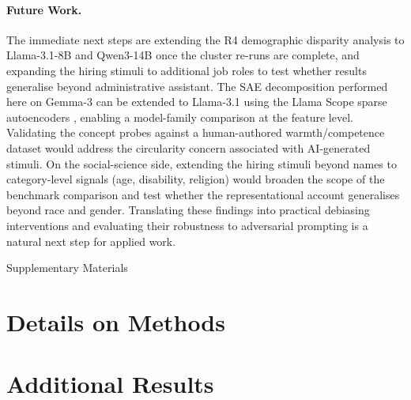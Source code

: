 \documentclass[twocolumn]{article}
\begin{document}
\paragraph{Future Work.}
The immediate next steps are extending the R4 demographic disparity
analysis to Llama-3.1-8B and Qwen3-14B once the cluster re-runs are
complete, and expanding the hiring stimuli to additional job roles to
test whether results generalise beyond administrative assistant.
The SAE decomposition performed here on Gemma-3 can be extended to
Llama-3.1 using the Llama Scope sparse autoencoders \citep{lindsey2025llama},
enabling a model-family comparison at the feature level.
Validating the concept probes against a human-authored warmth/competence
dataset would address the circularity concern associated with
AI-generated stimuli.
On the social-science side, extending the hiring stimuli beyond names to
category-level signals (age, disability, religion) would broaden the
scope of the benchmark comparison and test whether the representational
account generalises beyond race and gender.
Translating these findings into practical debiasing interventions and
evaluating their robustness to adversarial prompting is a natural next
step for applied work.

{
\small

\clearpage
\printbibliography
}



\clearpage
\onecolumn
\setcounter{figure}{0}
\setcounter{table}{0}
\renewcommand\appendix{\par
  \setcounter{section}{0}%
  \renewcommand{\thesection}{\Alph{section}}}
\renewcommand\thefigure{S.\arabic{figure}}
\renewcommand\thetable{S.\arabic{table}}
\begin{center}
    \begin{minipage}{\textwidth}
        \centering
        \fontsize{16}{20}\selectfont
        Supplementary Materials
    \end{minipage}
\end{center}
\vspace{.5cm}

\section*{Details on Methods}
\label{apx:methods}

\section*{Additional Results}
\end{document}
